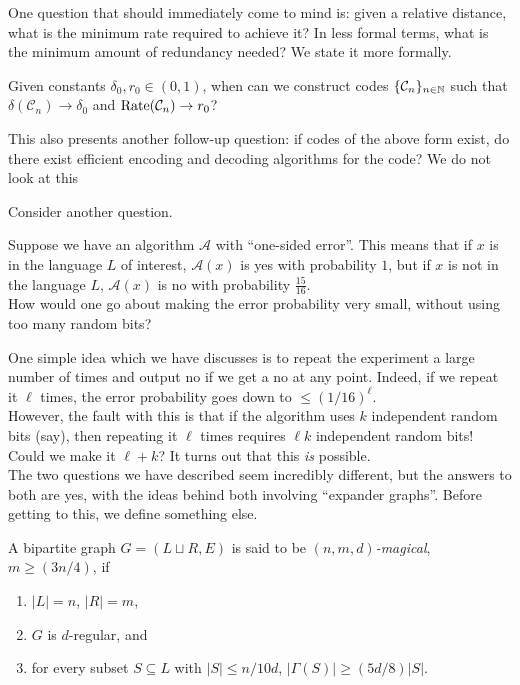 		One question that should immediately come to mind is: given a relative distance, what is the minimum rate required to achieve it? In less formal terms, what is the minimum amount of redundancy needed? We state it more formally.

		\begin{problem*}
			Given constants $\delta_0,r_0 \in (0,1)$, when can we construct codes $\{\mathcal{C}_n\}_{n \in \mathbb{N}}$ such that $\delta(\mathcal{C}_n) \to \delta_0$ and $\operatorname{Rate}(\mathcal{C}_n) \to r_0$?
		\end{problem*}
		This also presents another follow-up question: if codes of the above form exist, do there exist efficient encoding and decoding algorithms for the code? We do not look at this


		Consider another question.
		\begin{problem*}
			Suppose we have an algorithm $\mathcal{A}$ with ``one-sided error''. This means that if $x$ is in the language $L$ of interest, $\mathcal{A}(x)$ is yes with probability $1$, but if $x$ is not in the language $L$, $\mathcal{A}(x)$ is no with probability $\frac{15}{16}$.\\
			How would one go about making the error probability very small, without using too many random bits?
		\end{problem*}

		One simple idea which we have discusses is to repeat the experiment a large number of times and output no if we get a no at any point. Indeed, if we repeat it $\ell$ times, the error probability goes down to $\le (1/16)^{\ell}$. \\
		However, the fault with this is that if the algorithm uses $k$ independent random bits (say), then repeating it $\ell$ times requires $\ell k$ independent random bits! Could we make it $\ell+k$? It turns out that this \emph{is} possible.\\

		The two questions we have described seem incredibly different, but the answers to both are yes, with the ideas behind both involving ``expander graphs''. Before getting to this, we define something else. \\

		\begin{fdef}
			A bipartite graph $G = (L\sqcup R, E)$ is said to be \emph{$(n,m,d)$-magical}, $m \ge (3n/4)$, if
			\begin{enumerate}
				\item $|L|=n$, $|R|=m$,
				\item $G$ is $d$-regular, and
				\item for every subset $S \subseteq L$ with $|S| \le n/10d$, $|\Gamma(S)| \ge (5d/8)|S|$.
			\end{enumerate}
		\end{fdef}

